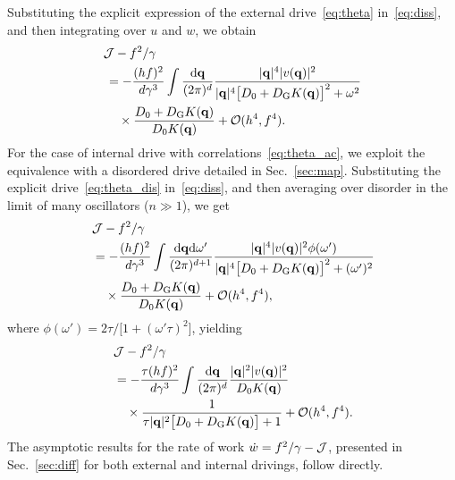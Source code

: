 \documentclass[superscriptaddress, twocolumn, prx, longbibliography, nofootinbib]{revtex4-1}
\begin{document}
Substituting the explicit expression of the external drive~\eqref{eq:theta} in~\eqref{eq:diss}, and then integrating over $u$ and $w$, we obtain
\begin{equation}
	\begin{aligned}
		&{\cal J} - f^2/\gamma
		\\
		&\,= - \frac{(hf)^2}{d\gamma^3} \int \frac{{\rm d}{\bf q}}{(2\pi)^d} \frac{|{\bf q}|^4 |v({\bf q})|^2}{|{\bf q}|^4\big[D_0+D_{\rm G}K({\bf q})\big]^2 + \omega^2}
		\\
		&\,\quad\times \frac{D_0+D_{\rm G}K({\bf q})}{D_0K({\bf q})} + {\cal O}(h^4,f^4) .
	\end{aligned}
\end{equation}
For the case of internal drive with correlations~\eqref{eq:theta_ac}, we exploit the equivalence with a disordered drive detailed in Sec.~\ref{sec:map}. Substituting the explicit drive~\eqref{eq:theta_dis} in~\eqref{eq:diss}, and then averaging over disorder in the limit of many oscillators ($n\gg1$), we get
\begin{equation}
	\begin{aligned}
		&{\cal J} - f^2/\gamma
		\\
		\,&= - \frac{(hf)^2}{d\gamma^3} \int \frac{{\rm d}{\bf q}{\rm d}\omega'}{(2\pi)^{d+1}} \frac{|{\bf q}|^4 |v({\bf q})|^2 \phi(\omega')}{|{\bf q}|^4\big[D_0+D_{\rm G}K({\bf q})\big]^2 + (\omega')^2}
		\\
		&\quad\times \frac{D_0+D_{\rm G}K({\bf q})}{D_0K({\bf q})} + {\cal O}(h^4,f^4) ,
	\end{aligned}
\end{equation}
where $\phi(\omega') = 2\tau/\big[1+(\omega'\tau)^2\big]$, yielding
\begin{equation}
	\begin{aligned}
		&{\cal J} - f^2/\gamma
		\\
		\,&= - \frac{\tau(hf)^2}{d\gamma^3} \int \frac{{\rm d}{\bf q}}{(2\pi)^d} \frac{|{\bf q}|^2 |v({\bf q})|^2}{D_0 K({\bf q})}
		\\
		&\quad\times \frac{1}{\tau|{\bf q}|^2\big[D_0+D_{\rm G}K({\bf q})\big] + 1} + {\cal O}(h^4,f^4) .
	\end{aligned}
\end{equation}
The asymptotic results for the rate of work $\dot w = f^2/\gamma-{\cal J}$, presented in Sec.~\ref{sec:diff} for both external and internal drivings, follow directly.
\end{document}
